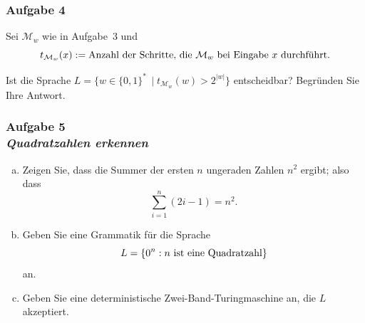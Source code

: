 \documentclass{beamer}
\begin{document}
	\begin{frame} \frametitle{Aufgabe 4}
		\small
		Sei $\mathcal{M}_w$ wie in Aufgabe~3 und 
		\begin{equation*}
		t_{\mathcal{M}_w} (x)
		\mathrel{:=}
		\text{Anzahl der Schritte, die $\mathcal{M}_w$ bei
			Eingabe $x$ durchf\"uhrt.}
		\end{equation*}
		
		Ist die Sprache $L = \{ w \in \{0,1\}^\ast  \, \mid t_{\mathcal{M}_w}(w) > 2^{|w|} \}$ entscheidbar?
		Begründen Sie Ihre Antwort.
	\end{frame}

	\begin{frame} \frametitle{Aufgabe 5 \\ \itshape Quadratzahlen erkennen}
		\begin{enumerate}[(a)]
			\item Zeigen Sie, dass die Summer der ersten $n$ ungeraden Zahlen $n^2$ ergibt; also dass
			\begin{equation*}
				\sum_{i=1}^n (2i - 1) = n^2 .
			\end{equation*}
			\item Geben Sie eine Grammatik für die Sprache 
			\begin{equation*}
				L = \left\{ 0^n : n \text{ ist eine Quadratzahl} \right\}
			\end{equation*}
			an.
			\item Geben Sie eine deterministische Zwei-Band-Turingmaschine an, die $L$ akzeptiert.
		\end{enumerate}
	\end{frame}

	
	
\end{document}
